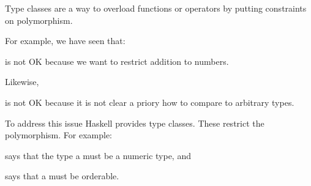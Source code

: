 Type classes are a way to overload functions or operators by putting
constraints on polymorphism.

For example, we have seen that:

\begin{Shaded}
\begin{Highlighting}[]
\OtherTok{(+) ::} \OtherTok{->} \OtherTok{->} 
\end{Highlighting}
\end{Shaded}

is not OK because we want to restrict addition to numbers.

Likewise,

\begin{Shaded}
\begin{Highlighting}[]
\OtherTok{    (<) ::} \OtherTok{->} \OtherTok{->} 
\end{Highlighting}
\end{Shaded}

is not OK because it is not clear a priory how to compare to arbitrary
types.

To address this issue Haskell provides type classes. These restrict the
polymorphism. For example:

\begin{Shaded}
\begin{Highlighting}[]
\OtherTok{    (+) ::}  \OtherTok{=>} \OtherTok{->} \OtherTok{->} 
\end{Highlighting}
\end{Shaded}

says that the type a must be a numeric type, and

\begin{Shaded}
\begin{Highlighting}[]
\OtherTok{    (<) ::}  \OtherTok{=>} \OtherTok{->} \OtherTok{->} 
\end{Highlighting}
\end{Shaded}

says that a must be orderable.
